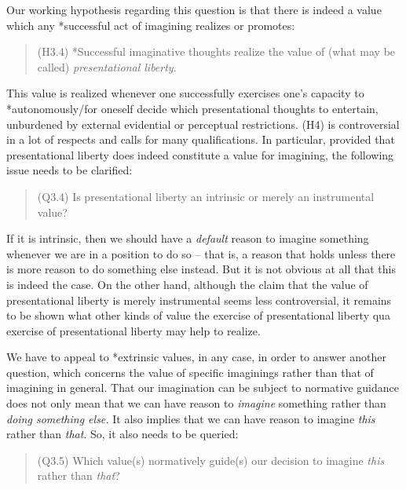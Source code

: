 \noindent Our working hypothesis regarding this question is that there is indeed a value which any *successful act of imagining realizes or promotes:

\vspace{-.2cm}
\begin{quote}
(H3.4) *Successful imaginative thoughts realize the value of (what may be called) \emph{presentational liberty}.
\end{quote}
\vspace{-.2cm}

\noindent This value is realized whenever one successfully exercises one's capacity to *autonomously/for oneself decide which presentational thoughts to entertain, unburdened by external evidential or perceptual restrictions. (H4) is controversial in a lot of respects and calls for many qualifications. In particular, provided that presentational liberty does indeed constitute a value for imagining, the following issue needs to be clarified:

\vspace{-.2cm}
\begin{quote}
(Q3.4) Is presentational liberty an intrinsic or merely an instrumental value?
\end{quote}
\vspace{-.2cm}

\noindent If it is intrinsic, then we should have a \emph{default} reason to imagine something whenever we are in a position to do so -- that is, a reason that holds unless there is more reason to do something else instead. But it is not obvious at all that this is indeed the case. On the other hand, although the claim that the value of presentational liberty is merely instrumental seems less controversial, it remains to be shown what other kinds of value the exercise of presentational liberty qua exercise of presentational liberty may help to realize.


We have to appeal to *extrinsic values, in any case, in order to answer another question, which concerns the value of specific imaginings rather than that of imagining in general. That our imagination can be subject to normative guidance does not only mean that we can have reason to \emph{imagine} something rather than \emph{doing something else.} It also implies that we can have reason to imagine \emph{this} rather than \emph{that}. So, it also needs to be queried:

\vspace{-.2cm}
\begin{quote}
(Q3.5) Which value(s) normatively guide(s) our decision to imagine \emph{this} rather than \emph{that}?
\end{quote}
\vspace{-.2cm}


